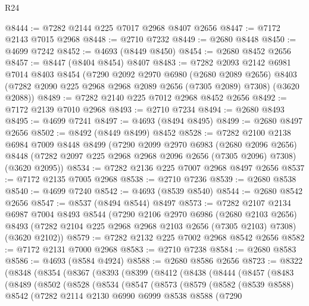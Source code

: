 \begin{lexlean}{R24}
\begin{coremodule}
@8444 := @7282 @2144 @225 @7017 @2968 @8407 @2656
@8447 := @7172 @2143 @7015 @2968
@8448 := @2710 @7232
@8449 := @2680 @8448
@8450 := @4699 @7242
@8452 := @4693 (@8449 @8450)
@8454 := @2680 @8452 @2656
@8457 := @8447 (@8404 @8454) @8407
@8483 := @7282
    @2093
    @2142
    @6981
    @7014
    @8403
    @8454
    (@7290
      @2092
      @2970
      @6980
      (@2680 @2089 @2656)
      @8403
      (@7282 @2090 @225 @2968 @2968 @2089 @2656 (@7305 @2089) @7308)
      (@3620 @2088))
@8489 := @7282 @2140 @225 @7012 @2968 @8452 @2656
@8492 := @7172 @2139 @7010 @2968
@8493 := @2710 @7234
@8494 := @2680 @8493
@8495 := @4699 @7241
@8497 := @4693 (@8494 @8495)
@8499 := @2680 @8497 @2656
@8502 := @8492 (@8449 @8499) @8452
@8528 := @7282
    @2100
    @2138
    @6984
    @7009
    @8448
    @8499
    (@7290
      @2099
      @2970
      @6983
      (@2680 @2096 @2656)
      @8448
      (@7282 @2097 @225 @2968 @2968 @2096 @2656 (@7305 @2096) @7308)
      (@3620 @2095))
@8534 := @7282 @2136 @225 @7007 @2968 @8497 @2656
@8537 := @7172 @2135 @7005 @2968
@8538 := @2710 @7236
@8539 := @2680 @8538
@8540 := @4699 @7240
@8542 := @4693 (@8539 @8540)
@8544 := @2680 @8542 @2656
@8547 := @8537 (@8494 @8544) @8497
@8573 := @7282
    @2107
    @2134
    @6987
    @7004
    @8493
    @8544
    (@7290
      @2106
      @2970
      @6986
      (@2680 @2103 @2656)
      @8493
      (@7282 @2104 @225 @2968 @2968 @2103 @2656 (@7305 @2103) @7308)
      (@3620 @2102))
@8579 := @7282 @2132 @225 @7002 @2968 @8542 @2656
@8582 := @7172 @2131 @7000 @2968
@8583 := @2710 @7238
@8584 := @2680 @8583
@8586 := @4693 (@8584 @4924)
@8588 := @2680 @8586 @2656
@8723 := @8322
    (@8348
      (@8354
        (@8367
          (@8393
            (@8399
              (@8412
                (@8438
                  (@8444
                    (@8457
                      (@8483
                        (@8489
                          (@8502
                            (@8528
                              (@8534
                                (@8547
                                  (@8573
                                    (@8579
                                      (@8582
                                        (@8539 @8588)
                                        @8542
                                        (@7282
                                          @2114
                                          @2130
                                          @6990
                                          @6999
                                          @8538
                                          @8588
                                          (@7290

\end{coremodule}
\end{lexlean}
